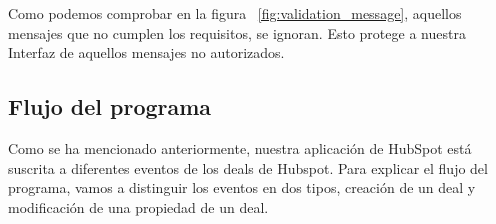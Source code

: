 


Como podemos comprobar en la figura ~\ref{fig:validation_message}, aquellos mensajes que no cumplen los requisitos, se ignoran. Esto protege a nuestra Interfaz de aquellos mensajes no autorizados.




\subsection{Flujo del programa}

Como se ha mencionado anteriormente, nuestra aplicación de HubSpot está suscrita a diferentes eventos de los deals de Hubspot.
Para explicar el flujo del programa, vamos a distinguir los eventos en dos tipos, creación de un deal y modificación de una propiedad de un deal.

